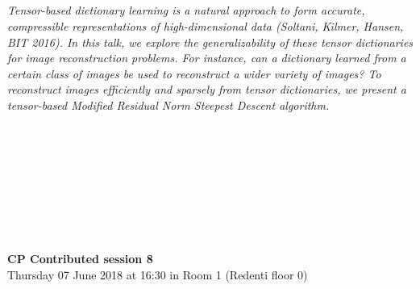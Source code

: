 \begin{multicols}{2}
      \\
      \\\\
\\
    \textit{Tensor-based dictionary learning is a natural approach to form accurate, compressible representations of high-dimensional data (Soltani, Kilmer, Hansen, BIT 2016).  In this talk, we explore the generalizability of these tensor dictionaries for image reconstruction problems.  For instance, can a dictionary learned from a certain class of images be used to reconstruct a wider variety of images?  To reconstruct images efficiently and sparsely from tensor dictionaries, we present a tensor-based Modified Residual Norm Steepest Descent algorithm.}\\
\\ 
      \\
      \\\\
      \\
      \\\\
\\
  \end{multicols}
  \noindent\textbf{CP Contributed session 8}\\
    Thursday 07 June 2018 at 16:30 in Room 1 (Redenti floor 0)  \\
  \textit{} \\
    
